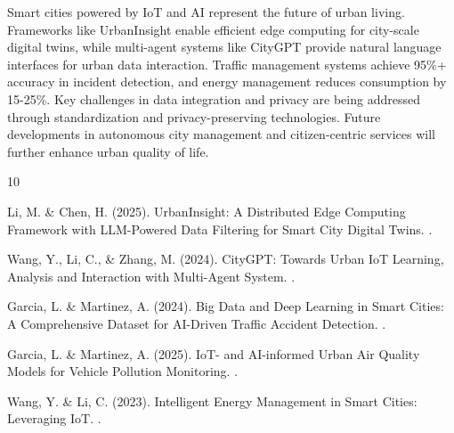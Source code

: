 \documentclass[12pt,a4paper]{article}
\begin{document}
Smart cities powered by IoT and AI represent the future of urban living. Frameworks like UrbanInsight enable efficient edge computing for city-scale digital twins, while multi-agent systems like CityGPT provide natural language interfaces for urban data interaction. Traffic management systems achieve 95\%+ accuracy in incident detection, and energy management reduces consumption by 15-25\%. Key challenges in data integration and privacy are being addressed through standardization and privacy-preserving technologies. Future developments in autonomous city management and citizen-centric services will further enhance urban quality of life.


\begin{thebibliography}{10}

Li, M. \& Chen, H. (2025).
\newblock UrbanInsight: A Distributed Edge Computing Framework with LLM-Powered Data Filtering for Smart City Digital Twins.
.

Wang, Y., Li, C., \& Zhang, M. (2024).
\newblock CityGPT: Towards Urban IoT Learning, Analysis and Interaction with Multi-Agent System.
.

Garcia, L. \& Martinez, A. (2024).
\newblock Big Data and Deep Learning in Smart Cities: A Comprehensive Dataset for AI-Driven Traffic Accident Detection.
.

Garcia, L. \& Martinez, A. (2025).
\newblock IoT- and AI-informed Urban Air Quality Models for Vehicle Pollution Monitoring.
.

Wang, Y. \& Li, C. (2023).
\newblock Intelligent Energy Management in Smart Cities: Leveraging IoT.
.

\end{thebibliography}
\end{document}
